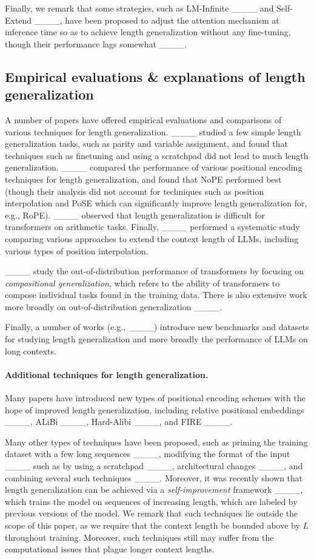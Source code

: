 Finally, we remark that some strategies, such as LM-Infinite ____ and Self-Extend ____, have been proposed to adjust the attention mechanism at inference time so as to achieve length generalization without any fine-tuning, though their performance lags somewhat ____. 





\subsection{Empirical evaluations \& explanations of length generalization}
A number of papers have offered empirical evaluations and comparisons of various techniques for length generalization. ____ studied a few simple length generalization tasks, such as parity and variable assignment, and found that techniques such as finetuning and using a scratchpad did not lead to much length generalization. 
____ compared the performance of various positional encoding techniques for length generalization, and found that NoPE performed best (though their analysis did not account for techniques such as position interpolation and PoSE which can significantly improve length generalization for, e.g., RoPE).  ____ observed that length generalization is difficult for transformers on arithmetic tasks. 
Finally, ____ performed a systematic study comparing various approaches to extend the context length of LLMs, including various types of position interpolation. 


____ study the out-of-distribution performance of transformers by focusing on \emph{compositional generalization}, which refers to the ability of transformers to compose individual tasks found in the training data. There is also extensive work more broadly on out-of-distribution generalization ____.

Finally, a number of works (e.g., ____) introduce new benchmarks and datasets for studying length generalization and more broadly the performance of LLMs on long contexts. 




\paragraph{Additional techniques for length generalization.} Many papers have introduced new types of positional encoding schemes with the hope of improved length generalization, including relative positional embeddings ____, ALiBi ____, Hard-Alibi ____, and FIRE ____. 


Many other types of techniques have  been proposed, such as priming the training dataset with a few long sequences ____, %
modifying the format of the input ____ such as by using a scratchpad ____, architectural changes ____, 
and combining several such techniques ____. Moreover, it was recently shown that length generalization can be achieved via a \emph{self-improvement} framework ____, which trains the model on sequences of increasing length, which are labeled by previous versions of the model.  We remark that such techniques lie outside the scope of this paper, as we require that the context length be bounded above by $L$ throughout training. Moreover, such techniques still may suffer from the computational issues that plague longer context lengths.